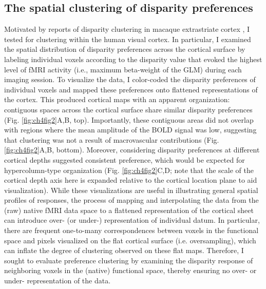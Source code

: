 \subsection{The spatial clustering of disparity preferences}
Motivated by reports of disparity clustering in macaque extrastriate cortex \cite{Anzai:2011gb,Yeagle_Lafer-Sousa_Conway_2013}, I tested for clustering within the human visual cortex. In particular, I examined the spatial distribution of disparity preferences across the cortical surface by labeling individual voxels according to the disparity value that evoked the highest level of fMRI activity (i.e., maximum beta-weight of the GLM) during each imaging session. To visualize the data, I color-coded the disparity preferences of individual voxels and mapped these preferences onto flattened representations of the cortex. This produced cortical maps with an apparent organization: contiguous spaces across the cortical surface share similar disparity preferences (Fig. \ref{fig:ch4fig2}A,B, top). Importantly, these contiguous areas did not overlap with regions where the mean amplitude of the BOLD signal was low, suggesting that clustering was not a result of macrovascular contributions (Fig. \ref{fig:ch4fig2}A,B, bottom). Moreover, considering disparity preferences at different cortical depths suggested consistent preference, which would be expected for hypercolumn-type organization (Fig. \ref{fig:ch4fig2}C,D; note that the scale of the cortical depth axis here is expanded relative to the cortical location plane to aid visualization).
While these visualizations are useful in illustrating general spatial profiles of responses, the process of mapping and interpolating the data from the (raw) native fMRI data space to a flattened representation of the cortical sheet can introduce over- (or under-) representation of individual datum. In particular, there are frequent one-to-many correspondences between voxels in the functional space and pixels visualized on the flat cortical surface (i.e. oversampling), which can inflate the degree of clustering observed on these flat maps. Therefore, I sought to evaluate preference clustering by examining the disparity response of neighboring voxels in the (native) functional space, thereby ensuring no over- or under- representation of the data. 

